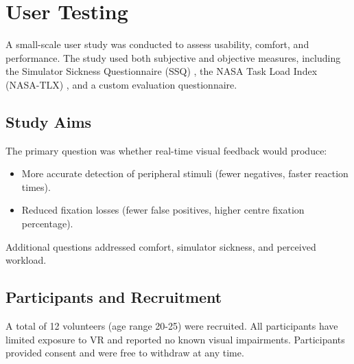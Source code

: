 \documentclass{l4proj}
\begin{document}
\section{User Testing}
A small-scale user study was conducted to assess usability, comfort, and performance. The study used both subjective and objective measures, including the Simulator Sickness Questionnaire (SSQ) \citep{eval6}, the NASA Task Load Index (NASA-TLX) \cite{eval7}, and a custom evaluation questionnaire.

\subsection{Study Aims}
The primary question was whether real-time visual feedback would produce:
\begin{itemize}
    \item More accurate detection of peripheral stimuli (fewer negatives, faster reaction times).
    \item Reduced fixation losses (fewer false positives, higher centre fixation percentage).
\end{itemize}
Additional questions addressed comfort, simulator sickness, and perceived workload.

\subsection{Participants and Recruitment}
A total of 12 volunteers (age range 20-25) were recruited. All participants have limited exposure to VR and reported no known visual impairments. Participants provided consent and were free to withdraw at any time.
\end{document}
